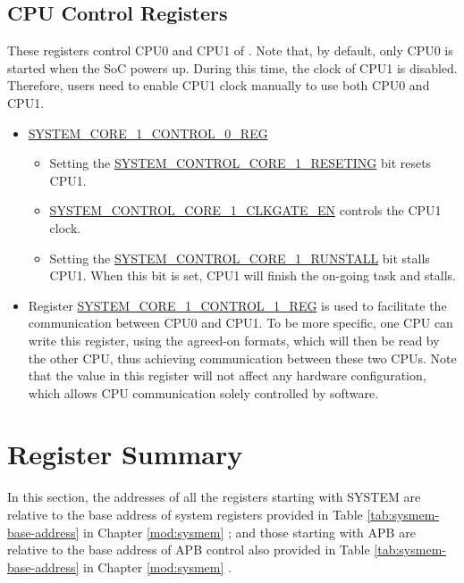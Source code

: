\documentclass[main\_\_EN.tex]{subfiles}
\begin{document}
\subsection{CPU Control Registers}
These registers control CPU0 and CPU1 of \chipname. Note that, by default, only CPU0 is started when the SoC powers up. During this time, the clock of CPU1 is disabled. Therefore, users need to enable CPU1 clock manually to use both CPU0 and CPU1.
\begin{itemize}
    \item \hyperref[regdesc:SYSTEMCORE1CONTROL0REG]{SYSTEM\_CORE\_1\_CONTROL\_0\_REG}
    \begin{itemize}
        \item Setting the \hyperref[fielddesc:SYSTEMCONTROLCORE1RESETING]{SYSTEM\_CONTROL\_CORE\_1\_RESETING} bit resets CPU1.
    \item \hyperref[fielddesc:SYSTEMCONTROLCORE1CLKGATEEN]{SYSTEM\_CONTROL\_CORE\_1\_CLKGATE\_EN} controls the CPU1 clock.
    \item Setting the \hyperref[fielddesc:SYSTEMCONTROLCORE1RUNSTALL]{SYSTEM\_CONTROL\_CORE\_1\_RUNSTALL} bit stalls CPU1. When this bit is set, CPU1 will finish the on-going task and stalls.
    \end{itemize}
    \item Register \hyperref[regdesc:SYSTEMCORE1CONTROL1REG]{SYSTEM\_CORE\_1\_CONTROL\_1\_REG} is used to facilitate the communication between CPU0 and CPU1. To be more specific, one CPU can write this register, using the agreed-on formats, which will then be read by the other CPU, thus achieving communication between these two CPUs. Note that the value in this register will not affect any hardware configuration, which allows CPU communication solely controlled by software.
\end{itemize}


\clearpage
\section{Register Summary}
\hypertarget{sysreg-reg-summ}{}
\label{sec:sysreg-reg-summ}

In this section, the addresses of all the registers starting with SYSTEM are relative to the base address of system registers provided in Table \ref{tab:sysmem-base-address} in Chapter \ref{mod:sysmem} \textit{}; and those starting with APB are relative to the base address of APB control also provided in Table \ref{tab:sysmem-base-address} in Chapter \ref{mod:sysmem} \textit{}.
\end{document}
